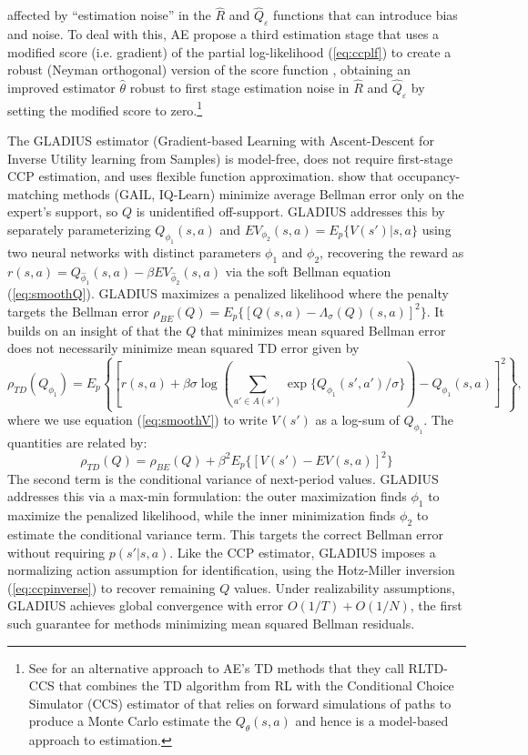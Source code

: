  affected by ``estimation noise'' in the $\hat R$ and $\hat Q_{\varepsilon}$ functions
that can introduce bias and noise. To deal with this, AE propose a third estimation stage that uses  
a modified  score (i.e. gradient) of the  partial log-likelihood (\ref{eq:ccplf}) to create 
a robust (Neyman orthogonal) version of the score function \citep{lrspe:2022},
obtaining an improved estimator $\hat\theta$ robust to first stage estimation
noise in $\hat R$ and $\hat Q_\varepsilon$ by setting the modified score to zero.\footnote{\footnotesize
See \citet{khwaja:2025} for an alternative approach to AE's TD methods that they call RLTD-CCS that combines the TD algorithm 
from RL with the Conditional Choice Simulator (CCS) estimator of \citet{hmss:1994} that relies on forward simulations
of paths to produce a Monte Carlo estimate the $Q_\theta(s,a)$  and hence is a model-based approach to estimation.}

The GLADIUS estimator \citep{kang:2025} (Gradient-based Learning with Ascent-Descent for Inverse Utility learning from Samples) is model-free, does not require first-stage CCP estimation, and uses flexible function approximation. \citet{kang:2025} show that occupancy-matching methods (GAIL, IQ-Learn) minimize average Bellman error only on the expert's support, so $Q$ is unidentified off-support. GLADIUS addresses this by separately parameterizing $Q_{\phi_1}(s,a)$ and $EV_{\phi_2}(s,a) = E_p\{V(s')|s,a\}$ using two neural networks with distinct parameters $\phi_1$ and $\phi_2$, recovering the reward as $r(s,a) = Q_{\hat\phi_1}(s,a) - \beta EV_{\hat\phi_2}(s,a)$ via the soft Bellman equation (\ref{eq:smoothQ}).
GLADIUS maximizes a penalized likelihood where the penalty targets the Bellman error $\rho_{BE}(Q) = E_p\{[Q(s,a) - \Lambda_\sigma(Q)(s,a)]^2\}$. 
It builds on an insight of \citet{antos:2008} that the $Q$ that minimizes mean squared Bellman error does
not necessarily minimize mean squared TD error  given by
\begin{equation}
        \rho_{TD}(Q_{\phi_1})=E_p\left\{\left[r(s,a)+\beta\sigma\log\left(\sum_{a' \in A(s')}
\exp\{Q_{\phi_1}(s',a')/\sigma\}\right) -Q_{\phi_1}(s,a)\right]^2\right\},
\label{eq:msetd}
\end{equation}
where we use equation (\ref{eq:smoothV}) to write $V(s')$ as a log-sum of $Q_{\phi_1}$.
The quantities are related by:
\begin{equation}
   \rho_{TD}(Q)=\rho_{BE}(Q)+\beta^2 E_p\{[V(s')-EV(s,a)]^2\}
\label{eq:tdbe}
\end{equation}
The second term is the conditional variance of next-period values. GLADIUS addresses this via a max-min formulation: the outer maximization finds $\phi_1$ to maximize the penalized likelihood, while the inner minimization finds $\phi_2$ to estimate the conditional variance term. This targets the correct Bellman error without requiring $p(s'|s,a)$. Like the CCP estimator, GLADIUS imposes a normalizing action assumption for identification, using the Hotz-Miller inversion (\ref{eq:ccpinverse}) to recover remaining $Q$ values. Under realizability assumptions, GLADIUS achieves global convergence with error $O(1/T) + O(1/N)$, the first such guarantee for methods minimizing mean squared Bellman residuals.

